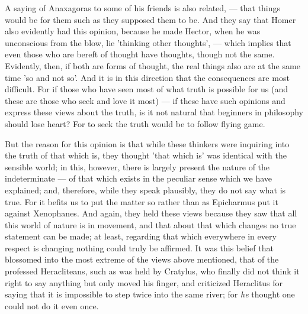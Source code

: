 A saying of Anaxagoras to some of his friends is also related, — that things would be for them such as they supposed them to be. And they say that Homer also evidently had this opinion, because he made Hector, when he was unconscious from the blow, lie 'thinking other thoughts', — which implies that even those who are bereft of thought have thoughts, though not the same. Evidently, then, if both are forms of thought, the real things also are at the same time 'so and not so'. And it is in this direction that the consequences are most difficult. For if those who have seen most of what truth is possible for us (and these are those who seek and love it most) — if these have such opinions and express these views about the truth, is it not natural that beginners in philosophy should lose heart? For to seek the truth would be to follow flying game.

But the reason for this opinion is that while these thinkers were inquiring into the truth of that which is, they thought 'that which is' was identical with the sensible world; in this, however, there is largely present the nature of the indeterminate — of that which exists in the peculiar sense which we have explained; and, therefore, while they speak plausibly, they do not say what is true. For it befits us to put the matter so rather than as Epicharmus put it against Xenophanes. And again, they held these views because they saw that all this world of nature is in movement, and that about that which changes no true statement can be made; at least, regarding that which everywhere in every respect is changing nothing could truly be affirmed. It was this belief that blossomed into the most extreme of the views above mentioned, that of the professed Heracliteans, such as was held by Cratylus, who finally did not think it right to say anything but only moved his finger, and criticized Heraclitus for saying that it is impossible to step twice into the same river; for \emph{he} thought one could not do it even once.

